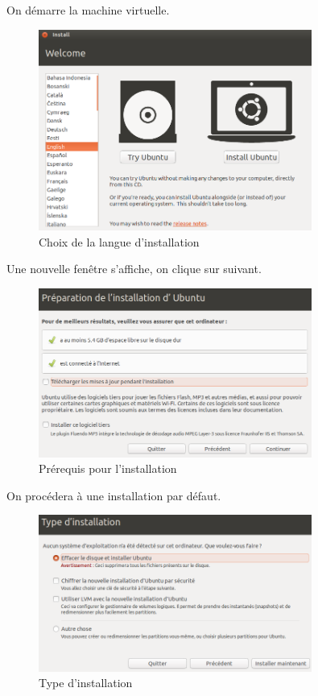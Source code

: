 \documentclass[11pt,a4paper,titlepage, oneside]{article}
\begin{document}
		On démarre la machine virtuelle.
	\newpage
		\begin{figure}[h]
                        \centering
                        \includegraphics[width=0.8\textwidth,natwidth=610,natheight=642]{images/demarrerISO.png}
                        \caption{Choix de la langue d'installation}
                \end{figure}
		Une nouvelle fenêtre s'affiche, on clique sur suivant.
		 \begin{figure}[h]
                        \centering
                        \includegraphics[width=0.8\textwidth,natwidth=610,natheight=642]{images/demarrerISO2.png}
                        \caption{Prérequis pour l'installation}
                \end{figure}
	\newpage
		On procédera à une installation par défaut.
		 \begin{figure}[h]
                        \centering
                        \includegraphics[width=0.8\textwidth,natwidth=610,natheight=642]{images/demarrerISO3.png}
                        \caption{Type d'installation}
                \end{figure}
		
\end{document}
